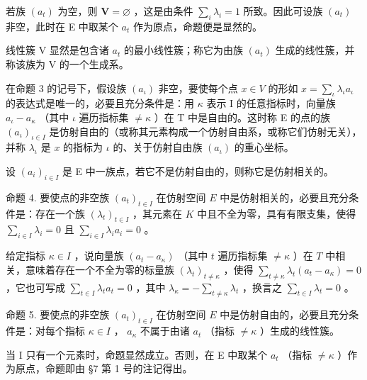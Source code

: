 若族 \((a_{t})\) 为空，则 \(\mathbf{V} = \varnothing\) ，这是由条件 \(\sum_{i}\lambda_{i} = 1\) 所致。因此可设族 \((a_{t})\) 非空，此时在 E 中取某个 \(a_{t}\) 作为原点，命题便是显然的。

线性簇 V 显然是包含诸 \(a_{t}\) 的最小线性簇；称它为由族 \((a_{t})\) 生成的线性簇，并称该族为 V 的一个生成系。

在命题 3 的记号下，假设族 \((a_{\iota})\) 非空，要使每个点 \(x \in V\) 的形如 \(x = \sum_{\iota} \lambda_{\iota} a_{\iota}\) 的表达式是唯一的，必要且充分条件是：用 \(\kappa\) 表示 I 的任意指标时，向量族 \(a_{\iota} - a_{\kappa}\) （其中 \(\iota\) 遍历指标集 \(\neq \kappa\) ）在 T 中是自由的。这时称 E 的点的族 \((a_{\iota})_{\iota \in I}\) 是仿射自由的（或称其元素构成一个仿射自由系，或称它们仿射无关），并称 \(\lambda_{\iota}\) 是 \(x\) 的指标为 \(\iota\) 的、关于仿射自由族 \((a_{\iota})\) 的重心坐标。

设 \((a_{i})_{i\in I}\) 是 E 中一族点，若它不是仿射自由的，则称它是仿射相关的。

命题 4. 要使点的非空族 \((a_{t})_{t\in I}\) 在仿射空间 \(E\) 中是仿射相关的，必要且充分条件是：存在一个族 \((\lambda_t)_{t\in I}\) ，其元素在 \(K\) 中且不全为零，具有有限支集，使得 \(\sum_{i\in I}\lambda_i = 0\) 且 \(\sum_{i\in I}\lambda_i a_i = 0\) 。

给定指标 \(\kappa \in I\) ，说向量族 \((a_{t} - a_{\kappa})\) （其中 \(t\) 遍历指标集 \(\neq \kappa\) ）在 \(T\) 中相关，意味着存在一个不全为零的标量族 \((\lambda_{t})_{t \neq \kappa}\) ，使得 \(\sum_{t \neq \kappa} \lambda_{t}(a_{t} - a_{\kappa}) = 0\) ，它也可写成 \(\sum_{t \in I} \lambda_{t} a_{t} = 0\) ，其中 \(\lambda_{\kappa} = -\sum_{t \neq \kappa} \lambda_{t}\) ，换言之 \(\sum_{t \in I} \lambda_{t} = 0\) 。

命题 5. 要使点的非空族 \((a_{t})_{t\in I}\) 在仿射空间 \(E\) 中是仿射自由的，必要且充分条件是：对每个指标 \(\kappa\in I\) ， \(a_{\kappa}\) 不属于由诸 \(a_{t}\) （指标 \(\neq\kappa\) ）生成的线性簇。

当 I 只有一个元素时，命题显然成立。否则，在 E 中取某个 \(a_{t}\) （指标 \(\neq\kappa\) ）作为原点，命题即由 §7 第 1 号的注记得出。

